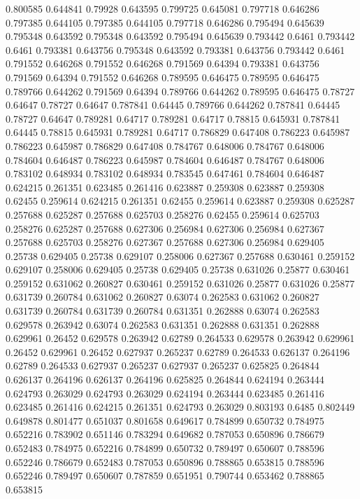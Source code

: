 0.800585 0.644841
0.79928 0.643595
0.799725 0.645081
0.797718 0.646286
0.797385 0.644105
0.797385 0.644105
0.797718 0.646286
0.795494 0.645639
0.795348 0.643592
0.795348 0.643592
0.795494 0.645639
0.793442 0.6461
0.793442 0.6461
0.793381 0.643756
0.795348 0.643592
0.793381 0.643756
0.793442 0.6461
0.791552 0.646268
0.791552 0.646268
0.791569 0.64394
0.793381 0.643756
0.791569 0.64394
0.791552 0.646268
0.789595 0.646475
0.789595 0.646475
0.789766 0.644262
0.791569 0.64394
0.789766 0.644262
0.789595 0.646475
0.78727 0.64647
0.78727 0.64647
0.787841 0.64445
0.789766 0.644262
0.787841 0.64445
0.78727 0.64647
0.789281 0.64717
0.789281 0.64717
0.78815 0.645931
0.787841 0.64445
0.78815 0.645931
0.789281 0.64717
0.786829 0.647408
0.786223 0.645987
0.786223 0.645987
0.786829 0.647408
0.784767 0.648006
0.784767 0.648006
0.784604 0.646487
0.786223 0.645987
0.784604 0.646487
0.784767 0.648006
0.783102 0.648934
0.783102 0.648934
0.783545 0.647461
0.784604 0.646487
0.624215 0.261351
0.623485 0.261416
0.623887 0.259308
0.623887 0.259308
0.62455 0.259614
0.624215 0.261351
0.62455 0.259614
0.623887 0.259308
0.625287 0.257688
0.625287 0.257688
0.625703 0.258276
0.62455 0.259614
0.625703 0.258276
0.625287 0.257688
0.627306 0.256984
0.627306 0.256984
0.627367 0.257688
0.625703 0.258276
0.627367 0.257688
0.627306 0.256984
0.629405 0.25738
0.629405 0.25738
0.629107 0.258006
0.627367 0.257688
0.630461 0.259152
0.629107 0.258006
0.629405 0.25738
0.629405 0.25738
0.631026 0.25877
0.630461 0.259152
0.631062 0.260827
0.630461 0.259152
0.631026 0.25877
0.631026 0.25877
0.631739 0.260784
0.631062 0.260827
0.63074 0.262583
0.631062 0.260827
0.631739 0.260784
0.631739 0.260784
0.631351 0.262888
0.63074 0.262583
0.629578 0.263942
0.63074 0.262583
0.631351 0.262888
0.631351 0.262888
0.629961 0.26452
0.629578 0.263942
0.62789 0.264533
0.629578 0.263942
0.629961 0.26452
0.629961 0.26452
0.627937 0.265237
0.62789 0.264533
0.626137 0.264196
0.62789 0.264533
0.627937 0.265237
0.627937 0.265237
0.625825 0.264844
0.626137 0.264196
0.626137 0.264196
0.625825 0.264844
0.624194 0.263444
0.624793 0.263029
0.624793 0.263029
0.624194 0.263444
0.623485 0.261416
0.623485 0.261416
0.624215 0.261351
0.624793 0.263029
0.803193 0.6485
0.802449 0.649878
0.801477 0.651037
0.801658 0.649617
0.784899 0.650732
0.784975 0.652216
0.783902 0.651146
0.783294 0.649682
0.787053 0.650896
0.786679 0.652483
0.784975 0.652216
0.784899 0.650732
0.789497 0.650607
0.788596 0.652246
0.786679 0.652483
0.787053 0.650896
0.788865 0.653815
0.788596 0.652246
0.789497 0.650607
0.787859 0.651951
0.790744 0.653462
0.788865 0.653815
